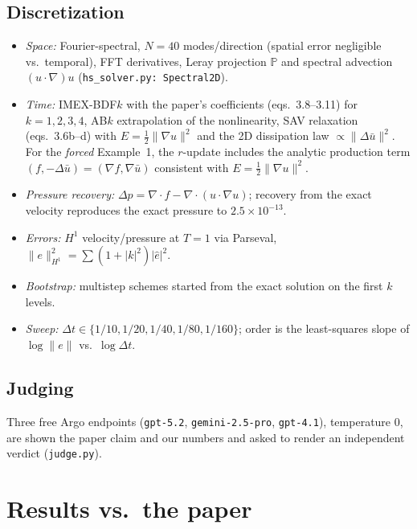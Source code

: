 \documentclass[11pt]{article}
\begin{document}
\subsection{Discretization}
\begin{itemize}[leftmargin=1.6em]
  \item \emph{Space:} Fourier-spectral, $N=40$ modes/direction (spatial error
        negligible vs.\ temporal), FFT derivatives, Leray projection
        $\mathbb{P}$ and spectral advection $(u\cdot\nabla)u$
        (\texttt{hs\_solver.py:~Spectral2D}).
  \item \emph{Time:} IMEX-BDF$k$ with the paper's coefficients (eqs.\
        3.8--3.11) for $k=1,2,3,4$, AB$k$ extrapolation of the nonlinearity,
        SAV relaxation (eqs.\ 3.6b--d) with $E=\tfrac12\|\nabla u\|^2$ and
        the 2D dissipation law $\propto\|\Delta\bar u\|^2$. For the
        \emph{forced} Example~1, the $r$-update includes the analytic
        production term $(f,-\Delta\bar u)=(\nabla f,\nabla\bar u)$
        consistent with $E=\tfrac12\|\nabla u\|^2$.
  \item \emph{Pressure recovery:} $\Delta p=\nabla\cdot f -
        \nabla\cdot(u\cdot\nabla u)$; recovery from the exact velocity
        reproduces the exact pressure to $2.5\times10^{-13}$.
  \item \emph{Errors:} $H^1$ velocity/pressure at $T=1$ via Parseval,
        $\|e\|_{H^1}^2=\sum(1+|k|^2)|\hat e|^2$.
  \item \emph{Bootstrap:} multistep schemes started from the exact solution
        on the first $k$ levels.
  \item \emph{Sweep:} $\Delta t\in\{1/10,1/20,1/40,1/80,1/160\}$; order is
        the least-squares slope of $\log\|e\|$ vs.\ $\log\Delta t$.
\end{itemize}

\subsection{Judging}
Three free Argo endpoints (\texttt{gpt-5.2}, \texttt{gemini-2.5-pro},
\texttt{gpt-4.1}), temperature 0, are shown the paper claim and our numbers
and asked to render an independent verdict (\texttt{judge.py}).

\section{Results vs.\ the paper}
\end{document}
